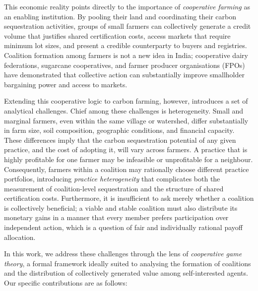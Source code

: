 \documentclass[manuscript, screen]{acmart}
\begin{document}
This economic reality points directly to the importance of \textit{cooperative farming} as an enabling institution. By pooling their land and coordinating their carbon sequestration activities, groups of small farmers can collectively generate a credit volume that justifies shared certification costs, access markets that require minimum lot sizes, and present a credible counterparty to buyers and registries. Coalition formation among farmers is not a new idea in India; cooperative dairy federations, sugarcane cooperatives, and farmer producer organisations (FPOs) have demonstrated that collective action can substantially improve smallholder bargaining power and access to markets. 

Extending this cooperative logic to carbon farming, however, introduces a set of analytical challenges. Chief among these challenges is heterogeneity. Small and marginal farmers, even within the same village or watershed, differ substantially in farm size, soil composition, geographic conditions, and financial capacity. These differences imply that the carbon sequestration potential of any given practice, and the cost of adopting it, will vary across farmers. A practice that is highly profitable for one farmer may be infeasible or unprofitable for a neighbour. Consequently, farmers within a coalition may rationally choose different practice portfolios, introducing \textit{practice heterogeneity} that complicates both the measurement of coalition-level sequestration and the structure of shared certification costs. Furthermore, it is insufficient to ask merely whether a coalition is collectively beneficial; a viable and stable coalition must also distribute its monetary gains in a manner that every member prefers participation over independent action, which is a question of fair and individually rational payoff allocation.

In this work, we address these challenges through the lens of \textit{cooperative game theory}, a formal framework ideally suited to analysing the formation of coalitions and the distribution of collectively generated value among self-interested agents. Our specific contributions are as follows:
\end{document}
